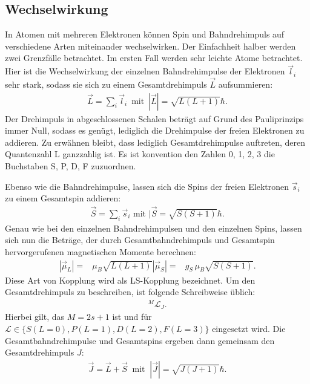 \subsection{Wechselwirkung}
\noindent In Atomen mit mehreren Elektronen können Spin und Bahndrehimpuls auf
verschiedene Arten miteinander wechselwirken.
Der Einfachheit halber werden zwei Grenzfälle betrachtet.
Im ersten Fall werden sehr leichte Atome betrachtet. Hier ist die Wechselwirkung
der einzelnen Bahndrehimpulse der Elektronen $\vec{l}_i$ sehr stark, sodass sie sich zu
einem Gesamtdrehimpuls $\vec{L}$ aufsummieren:
\FloatBarrier
\begin{align*}
    \vec{L} = \sum_i \vec{l}_i\, \text{ mit }\, |\vec{L}|=\sqrt{L(L+1)}\hbar.
\end{align*}
Der Drehimpuls in abgeschlossenen Schalen beträgt auf Grund des
Pauliprinzips immer Null, sodass es genügt, lediglich die Drehimpulse der freien
Elektronen zu addieren.
Zu erwähnen bleibt, dass lediglich Gesamtdrehimpulse auftreten, deren Quantenzahl L
ganzzahlig ist. Es ist konvention den Zahlen 0, 1, 2, 3 die Buchstaben S, P, D, F zuzuordnen.

\noindent Ebenso wie die Bahndrehimpulse, lassen sich die Spins der freien Elektronen $\vec{s}_i$
zu einem Gesamtspin addieren:
\begin{align*}
    \vec{S} = \sum_i \vec{s}_i \text{ mit } |\vec{S}=\sqrt{S(S+1)}\hbar.
\end{align*}
Genau wie bei den einzelnen Bahndrehimpulsen und den einzelnen Spins, lassen sich
nun die Beträge, der durch Gesamtbahndrehimpuls und Gesamtspin hervorgerufenen magnetischen
Momente berechnen:
\begin{align*}
    |\vec{\mu}_L| =& \mu_B\sqrt{L(L+1)}
    |\vec{\mu}_S| =& g_S \, \mu_B\sqrt{S(S+1)}.
\end{align*}
Diese Art von Kopplung wird als LS-Kopplung bezeichnet.
Um den Gesamtdrehimpuls zu beschreiben, ist folgende Schreibweise üblich:
\begin{align*}
    {}^M\mathcal{L}_J.
\end{align*}
Hierbei gilt, das $M=2s+1$ ist und für $\mathcal{L}\in\{S(L=0), P(L=1), D(L=2), F(L=3)\}$
eingesetzt wird.
Die Gesamtbahndrehimpulse und Gesamtspins ergeben dann gemeinsam den Gesamtdrehimpuls $J$:
\begin{align*}
    \vec{J}=\vec{L}+\vec{S} \ \text{ mit }\ |\vec{J}|=\sqrt{J(J+1)}\hbar.
\end{align*}

